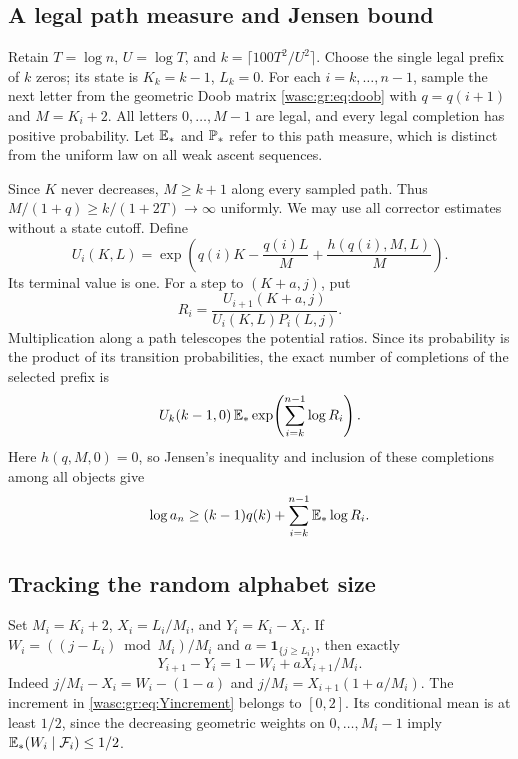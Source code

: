\documentclass[11pt,a4paper]{article}
\theoremstyle{remark}\newtheorem{remark}[theorem]{Remark}
\newcommand{\ind}{\mathbf 1}\newcommand{\wasc}{\operatorname{wasc}}\newcommand{\dasc}{\operatorname{dasc}}
\numberwithin{equation}{section}
\begin{document}
\subsection{A legal path measure and Jensen bound}
Retain $T=\log n$, $U=\log T$, and $k=\lceil100T^2/U^2\rceil$. Choose the single legal prefix of $k$ zeros; its state is $K_k=k-1$, $L_k=0$. For each $i=k,\ldots,n-1$, sample the next letter from the geometric Doob matrix \eqref{wasc:gr:eq:doob} with $q=q(i+1)$ and $M=K_i+2$. All letters $0,\ldots,M-1$ are legal, and every legal completion has positive probability. Let $\mathbb E_*$ and $\mathbb P_*$ refer to this path measure, which is distinct from the uniform law on all weak ascent sequences.

Since $K$ never decreases, $M\ge k+1$ along every sampled path. Thus $M/(1+q)\ge k/(1+2T)\to\infty$ uniformly. We may use all corrector estimates without a state cutoff. Define
\begin{equation}\label{wasc:gr:eq:uncutpotential}
U_i(K,L)=\exp\!\left(q(i)K-\frac{q(i)L}{M}+\frac{h(q(i),M,L)}M\right).
\end{equation}
Its terminal value is one. For a step to $(K+a,j)$, put
\begin{equation}\label{wasc:gr:eq:likelihood}
R_i=\frac{U_{i+1}(K+a,j)}{U_i(K,L)P_i(L,j)}.
\end{equation}
Multiplication along a path telescopes the potential ratios. Since its probability is the product of its transition probabilities, the exact number of completions of the selected prefix is
\[
U_k(k-1,0)\,\mathbb E_*\exp\!\left(\sum_{i=k}^{n-1}\log R_i\right).
\]
Here $h(q,M,0)=0$, so Jensen's inequality and inclusion of these completions among all objects give
\begin{equation}\label{wasc:gr:eq:jensen}
\log a_n\ge(k-1)q(k)+\sum_{i=k}^{n-1}\mathbb E_*\log R_i.
\end{equation}

\subsection{Tracking the random alphabet size}
Set $M_i=K_i+2$, $X_i=L_i/M_i$, and $Y_i=K_i-X_i$. If $W_i=((j-L_i)\bmod M_i)/M_i$ and $a=\ind_{\{j\ge L_i\}}$, then exactly
\begin{equation}\label{wasc:gr:eq:Yincrement}
Y_{i+1}-Y_i=1-W_i+aX_{i+1}/M_i.
\end{equation}
Indeed $j/M_i-X_i=W_i-(1-a)$ and $j/M_i=X_{i+1}(1+a/M_i)$. The increment in \eqref{wasc:gr:eq:Yincrement} belongs to $[0,2]$. Its conditional mean is at least $1/2$, since the decreasing geometric weights on $0,\ldots,M_i-1$ imply $\mathbb E_*(W_i\mid\mathcal F_i)\le1/2$.
\end{document}
